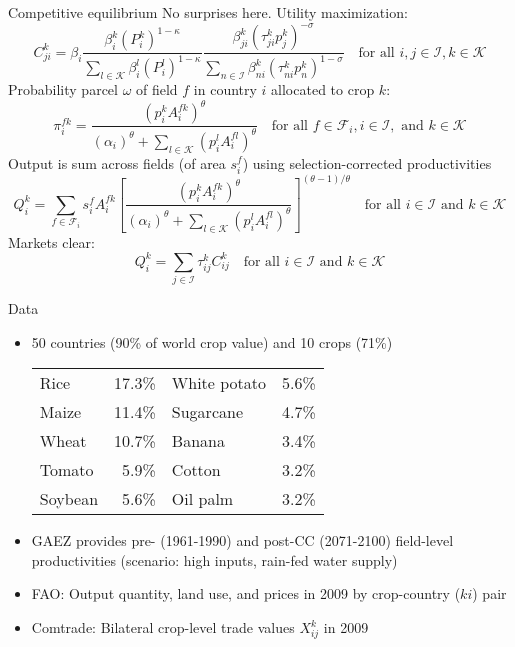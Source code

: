 \documentclass[11pt,notes=hide,aspectratio=169]{beamer}
\begin{document}
\begin{frame}{Competitive equilibrium}
No surprises here. Utility maximization:
\begin{equation*}
C_{ji}^k = \beta_i  \frac{\beta_i^k (P_i^k)^{1-\kappa}}{\sum_{l \in \mathcal{K}} \beta_i^l (P_i^l)^{1-\kappa}} \frac{\beta_{ji}^k (\tau_{ji}^k p_j^k)^{-\sigma}}{\sum_{n \in \mathcal{I}} \beta_{ni}^k (\tau_{ni}^k p_n^k)^{1-\sigma}} \quad \text{for all } i,j \in \mathcal{I}, k \in \mathcal{K}
\end{equation*}
Probability parcel $\omega$ of field $f$ in country $i$ allocated to crop $k$:
\begin{equation*}
\pi_i^{fk} = \frac{(p_i^k A_i^{fk})^{\theta}}{(\alpha_i)^{\theta} + \sum_{l \in \mathcal{K}} (p_i^l A_i^{fl})^{\theta}} \quad \text{for all } f \in \mathcal{F}_i, i \in \mathcal{I}, \text{ and } k \in \mathcal{K}
\end{equation*}
Output is sum across fields (of area $s_i^f$) using selection-corrected productivities
\begin{equation*}
Q_i^k = \sum_{f \in \mathcal{F}_i} s_i^f A_i^{fk} \left[ \frac{(p_i^k A_i^{fk})^{\theta}}{(\alpha_i)^{\theta} + \sum_{l \in \mathcal{K}} (p_i^l A_i^{fl})^{\theta}} \right]^{(\theta-1)/\theta} \quad \text{for all } i \in \mathcal{I} \text{ and } k \in \mathcal{K}
\end{equation*}
Markets clear:
\begin{equation*}
Q_i^k = \sum_{j \in \mathcal{I}} \tau_{ij}^k C_{ij}^k \quad \text{for all } i \in \mathcal{I} \text{ and } k \in \mathcal{K}
\end{equation*}
\end{frame}
\begin{frame}{Data}
\begin{itemize}
\item 50 countries (90\% of world crop value) and 10 crops (71\%)
\begin{center}
\begin{tabular}{lrlr}
Rice&17.3\%    &White potato&5.6\% \\
Maize&11.4\%   &Sugarcane&4.7\% \\
Wheat&10.7\%   &Banana&3.4\% \\
Tomato&5.9\%   &Cotton&3.2\% \\
Soybean&5.6\%  &Oil palm&3.2\% \\
\end{tabular}
\end{center}
\item GAEZ provides pre- (1961-1990) and post-CC (2071-2100) field-level productivities (scenario: high inputs, rain-fed water supply)
\item FAO: Output quantity, land use, and prices in 2009 by crop-country ($ki$) pair
\item Comtrade: Bilateral crop-level trade values $X_{ij}^k$ in 2009
\end{itemize}
\end{frame}
\end{document}
